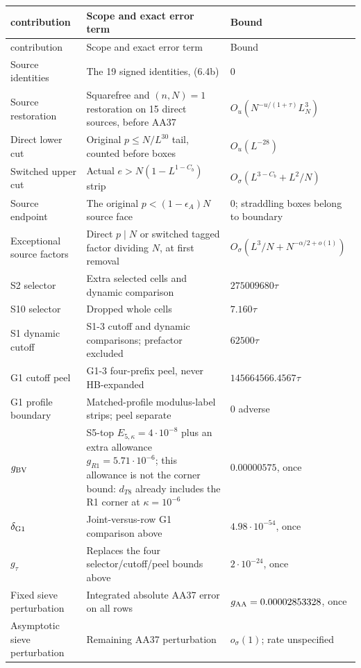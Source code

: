 \begin{longtable}{@{}p{}p{}p{}@{}}
contribution & Scope and exact error term & Bound \\ \hline
\endfirsthead
contribution & Scope and exact error term & Bound \\ \hline
\endhead
Source identities & The 19 signed identities, (6.4b) & $0$ \\
Source restoration & Squarefree and $(n,N)=1$ restoration on 15 direct sources, before AA37 & $O_u(N^{-u/(1+\tau)}L_N^3)$ \\
Direct lower cut & Original $p\le N/L^{30}$ tail, counted before boxes & $O_u(L^{-28})$ \\
Switched upper cut & Actual $e>N(1-L^{1-C_b})$ strip & $O_\sigma(L^{3-C_b}+L^2/N)$ \\
Source endpoint & The original $p<(1-\epsilon_A)N$ source face & $0$; straddling boxes belong to boundary \\
Exceptional source factors & Direct $p\mid N$ or switched tagged factor dividing $N$, at first removal & $O_\sigma(L^3/N+N^{-\alpha/2+o(1)})$ \\
S2 selector & Extra selected cells and dynamic comparison & $275009680\tau$ \\
S10 selector & Dropped whole cells & $7.160\tau$ \\
S1 dynamic cutoff & S1-3 cutoff and dynamic comparisons; prefactor excluded & $62500\tau$ \\
G1 cutoff peel & G1-3 four-prefix peel, never HB-expanded & $145664566.4567\tau$ \\
G1 profile boundary & Matched-profile modulus-label strips; peel separate & $0$ adverse \\
$g_{\rm BV}$ & S5-top $E_{5,\kappa}=4\cdot10^{-8}$ plus an extra allowance $g_{R1}=5.71\cdot10^{-6}$; this allowance is not the corner bound: $d_{T8}$ already includes the R1 corner at $\kappa=10^{-6}$ & $0.00000575$, once \\
$\delta_{\rm G1}$ & Joint-versus-row G1 comparison above & $4.98\cdot10^{-54}$, once \\
$g_\tau$ & Replaces the four selector/cutoff/peel bounds above & $2\cdot10^{-24}$, once \\
Fixed sieve perturbation & Integrated absolute AA37 error on all rows & $g_{\rm AA}=0.00002853328$, once \\
Asymptotic sieve perturbation & Remaining AA37 perturbation & $o_\sigma(1)$; rate unspecified \\

\end{longtable}
